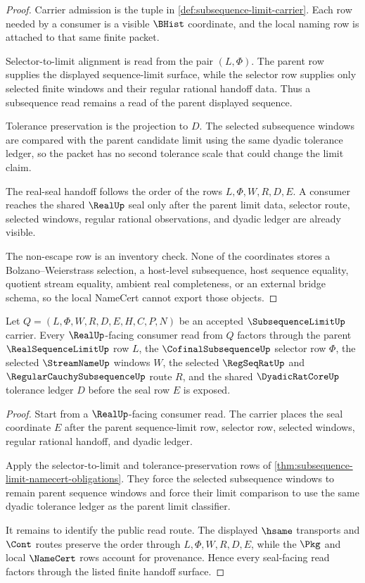 \begin{proof}
Carrier admission is the tuple in \autoref{def:subsequence-limit-carrier}. Each row needed by a consumer is a visible $\BHist$ coordinate, and the local naming row is attached to that same finite packet.

Selector-to-limit alignment is read from the pair $(L,\Phi)$. The parent row supplies the displayed sequence-limit surface, while the selector row supplies only selected finite windows and their regular rational handoff data. Thus a subsequence read remains a read of the parent displayed sequence.

Tolerance preservation is the projection to $D$. The selected subsequence windows are compared with the parent candidate limit using the same dyadic tolerance ledger, so the packet has no second tolerance scale that could change the limit claim.

The real-seal handoff follows the order of the rows $L,\Phi,W,R,D,E$. A consumer reaches the shared $\RealUp$ seal only after the parent limit data, selector route, selected windows, regular rational observations, and dyadic ledger are already visible.

The non-escape row is an inventory check. None of the coordinates stores a Bolzano--Weierstrass selection, a host-level subsequence, host sequence equality, quotient stream equality, ambient real completeness, or an external bridge schema, so the local NameCert cannot export those objects.
\end{proof}

\begin{theorem}\label{thm:subsequence-limit-real-seal-handoff}
Let $Q=(L,\Phi,W,R,D,E,H,C,P,N)$ be an accepted $\SubsequenceLimitUp$ carrier. Every $\RealUp$-facing consumer read from $Q$ factors through the parent $\RealSequenceLimitUp$ row $L$, the $\CofinalSubsequenceUp$ selector row $\Phi$, the selected $\StreamNameUp$ windows $W$, the selected $\RegSeqRatUp$ and $\RegularCauchySubsequenceUp$ route $R$, and the shared $\DyadicRatCoreUp$ tolerance ledger $D$ before the seal row $E$ is exposed.
\end{theorem}
\begin{proof}
Start from a $\RealUp$-facing consumer read. The carrier places the seal coordinate $E$ after the parent sequence-limit row, selector row, selected windows, regular rational handoff, and dyadic ledger.

Apply the selector-to-limit and tolerance-preservation rows of \autoref{thm:subsequence-limit-namecert-obligations}. They force the selected subsequence windows to remain parent sequence windows and force their limit comparison to use the same dyadic tolerance ledger as the parent limit classifier.

It remains to identify the public read route. The displayed $\hsame$ transports and $\Cont$ routes preserve the order through $L,\Phi,W,R,D,E$, while the $\Pkg$ and local $\NameCert$ rows account for provenance. Hence every seal-facing read factors through the listed finite handoff surface.
\end{proof}

